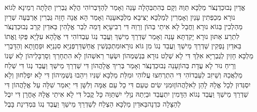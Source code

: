 \documentclass[../main/main.tex]{subfiles}
\begin{document}
\begin{multicols*}{\ncols}
אֱדַיִן נְבוּכַדְנֶצֹּר מַלְכָּא תְּוַהּ וְקָם בְּהִתְבְּהָלָה עָנֵה וְאָמַר לְהַדָּבְרוֹהִי הֲלָא גֻבְרִין תְּלָתָה רְמֵינָא לְגוֹא נוּרָא מְכַפְּתִין עָנַיִן וְאָמְרִין לְמַלְכָּא יַצִּיבָא מַלְכָּא\PreVerseSpace{}עָנֵה וְאָמַר הָא אֲנָה חָזֵה גֻּבְרִין אַרְבְּעָה שְׁרַיִן מַהְלְכִין בְּגוֹא נוּרָא וַחֲבָל לָא אִיתַי בְּהוֹן וְרֵוֵהּ דִּי רְבִיעָיָא דָּמֵה לְבַר אֱלָהִין \ClosedSection{}בֵּאדַיִן קְרֵב נְבוּכַדְנֶצֹּר לִתְרַע אַתּוּן נוּרָא יָקִדְתָּא עָנֵה וְאָמַר שַׁדְרַךְ מֵישַׁךְ וַעֲבֵד נְגוֹ עַבְדוֹהִי דִּי אֱלָהָא עִלָּיָא פֻּקוּ וֶאֱתוֹ בֵּאדַיִן נָפְקִין שַׁדְרַךְ מֵישַׁךְ וַעֲבֵד נְגוֹ מִן גּוֹא נוּרָא\PreVerseSpace{}וּמִתְכַּנְּשִׁין אֲחַשְׁדַּרְפְּנַיָּא סִגְנַיָּא וּפַחֲוָתָא וְהַדָּבְרֵי מַלְכָּא חָזַיִן לְגֻבְרַיָּא אִלֵּךְ דִּי לָא שְׁלֵט נוּרָא בְּגֶשְׁמְהוֹן וּשְׂעַר רֵאשְׁהוֹן לָא הִתְחָרַךְ וְסָרְבָּלֵיהוֹן לָא שְׁנוֹ וְרֵיחַ נוּר לָא עֲדָת בְּהוֹן\PreVerseSpace{}עָנֵה נְבוּכַדְנֶצֹּר וְאָמַר בְּרִיךְ אֱלָהֲהוֹן דִּי שַׁדְרַךְ מֵישַׁךְ וַעֲבֵד נְגוֹ דִּי שְׁלַח מַלְאֲכֵהּ וְשֵׁיזִב לְעַבְדוֹהִי דִּי הִתְרְחִצוּ עֲלוֹהִי וּמִלַּת מַלְכָּא שַׁנִּיו וִיהַבוּ גֶּשְׁמֵיהוֹן דִּי לָא יִפְלְחוּן וְלָא יִסְגְּדוּן לְכָל אֱלָהּ לָהֵן לֵאלָהֲהוֹן\PreVerseSpace{}וּמִנִּי שִׂים טְעֵם דִּי כָל עַם אֻמָּה וְלִשָּׁן דִּי יֵאמַר שִׁלָּה עַל אֱלָהֲהוֹן דִּי שַׁדְרַךְ מֵישַׁךְ וַעֲבֵד נְגוֹא הַדָּמִין יִתְעֲבֵד וּבַיְתֵהּ נְוָלִי יִשְׁתַּוֵּה כָּל קֳבֵל דִּי לָא אִיתַי אֱלָהּ אָחֳרָן דִּי יִכֻּל לְהַצָּלָה כִּדְנָה\PreVerseSpace{}בֵּאדַיִן מַלְכָּא הַצְלַח לְשַׁדְרַךְ מֵישַׁךְ וַעֲבֵד נְגוֹ בִּמְדִינַת בָּבֶל\OpenSection{}\par

\end{multicols*}
\end{document}
